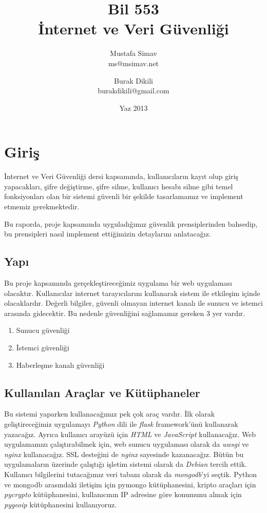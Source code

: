 \documentclass[11pt]{report}
\title{\textbf{Bil 553} \\ İnternet ve Veri Güvenliği}
\author{Mustafa Simav \\
        ms@msimav.net
    \and
        Burak Dikili \\
        burakdikili@gmail.com}
\date{Yaz 2013}
\begin{document}
\maketitle

\chapter{Giriş}

İnternet ve Veri Güvenliği dersi kapsamında, kullanıcıların kayıt olup giriş yapacakları, şifre değiştirme, şifre silme, kullanıcı hesabı silme gibi temel fonksiyonları olan bir sistemi güvenli bir şekilde tasarlamamız ve implement etmemiz gerekmektedir.

Bu raporda, proje kapsamında uyguladığımız güvenlik prensiplerinden bahsedip, bu prensipleri nasıl implement ettiğimizin detaylarını anlatacağız.

\section{Yapı}

Bu proje kapsamında gerçekleştireceğimiz uygulama bir web uygulaması olacaktır. Kullanıcılar internet tarayıcılarını kullanarak sistem ile etkileşim içinde olacaklardır. Değerli bilgiler, güvenli olmayan internet kanalı ile sunucu ve istemci arasında gidecektir. Bu nedenle güvenliğini sağlamamız gereken 3 yer vardır.

\begin{enumerate}
\item Sunucu güvenliği
\item İstemci güvenliği
\item Haberleşme kanalı güvenliği
\end{enumerate}

\section{Kullanılan Araçlar ve Kütüphaneler}

Bu sistemi yaparken kullanacağımız pek çok araç vardır. İlk olarak geliştireceğimiz uygulamayı \emph{Python} dili ile \emph{flask} framework'ünü kullanarak yazacağız. Ayrıca kullanıcı arayüzü için \emph{HTML} ve \emph{JavaScript} kullanacağız. Web uygulamamızı çalıştırabilmek için, web sunucu uygulaması olarak da \emph{uwsgi} ve \emph{nginx} kullanacağız. SSL desteğini de \emph{nginx} sayesinde kazanacağız. Bütün bu uygulamaların üzerinde çalıştığı işletim sistemi olarak da \emph{Debian} tercih ettik. Kullanıcı bilgilerini tutacağımız veri tabanı olarak da \emph{mongodb}'yi seçtik. Python ve mongodb arasındaki iletişim için pymongo kütüphanesini, kripto araçları için \emph{pycrypto} kütüphanesini, kullanıcının IP adresine göre konumunu almak için \emph{pygeoip} kütüphanesini kullanıyoruz.
\end{document}
